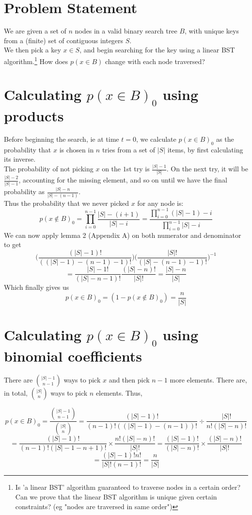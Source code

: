\documentclass[10pt,a4paper]{article}
\author{Christian Burke}
\begin{document}
\section*{Problem Statement}
We are given a set of $n$ nodes in a valid binary search tree $B$, with unique keys from a (finite) set of contiguous integers $S$.\\
We then pick a key $x \in S$, and begin searching for the key using a linear BST algorithm.\footnote{Is 'a linear BST' algorithm guaranteed to traverse nodes in a certain order? Can we prove that the linear BST algorithm is unique given certain constraints? (eg "nodes are traversed in same order")}
How does $p(x \in B)$ change with each node traversed?\\
\section*{Calculating $p(x \in B)_0$ using products}
Before beginning the search, ie at time $t=0$, we calculate $p(x \in B)_0$ as the probability that $x$ is chosen in $n$ tries from a set of $|S|$ items, by first calculating its inverse.\\
The probability of not picking $x$ on the $1$st try is $\frac{|S|-1}{|S|}$. On the next try, it will be $\frac{|S|-2}{|S|-1}$, accounting for the missing element, and so on until we have the final probability as $\frac{|S|-n}{|S| - (n-1)}$.\\
Thus the probability that we never picked $x$ for any node is:
$$p(x \not \in B)_0 = \prod_{i = 0}^{n-1} \frac{|S|-(i+1)}{|S| - i} = \frac{\prod_{i = 0}^{n-1} (|S|-1)-i}{\prod_{i = 0}^{n-1} |S| - i}$$
We can now apply lemma 2 (Appendix A) on both numerator and denominator to get
$$
\bigg(\frac{(|S|-1)!}{((|S|-1) - (n-1) - 1)!}\bigg)
\bigg(\frac{|S|!}{(|S| - (n-1) - 1)!}\bigg)^{-1}
$$
$$
= 
\frac{|S|-1!}{(|S|-n-1)!}
\frac{(|S|-n)!}{|S|!}
= \frac{|S|-n}{|S|}
$$
Which finally gives us\\
$$p(x \in B)_0 = (1-p(x \not \in B)_0) = \frac{n}{|S|}$$

\section*{Calculating $p(x \in B)_0$ using binomial coefficients}

There are $|S|-1 \choose n-1$ ways to pick $x$ and then pick $n-1$ more elements. There are, in total, $|S| \choose n$ ways to pick $n$ elements. Thus,

$$p(x \in B)_0
	= 
	\frac{
			{|S| - 1 \choose n-1}
		}{
			{|S| \choose n}
		}
= 	
		\frac{(|S|-1)!}{(n-1)!((|S|-1) - (n-1))!}
	\div
		\frac{|S|!}{n!(|S|-n)!}
$$
$$=	
		\frac{(|S|-1)!}{(n-1)!(|S|-1 - n + 1)!}
	\times
		\frac{n!(|S|-n)!}{|S|!}
=
		\frac{(|S|-1)!}{(|S| - n)!}
	\times
		\frac{(|S|-n)!}{|S|!}
$$
$$=
	\frac{
		(|S|-1)!n!
	}{
		|S|! (n-1)!
	} = \frac{n}{|S|}
$$
\end{document}
